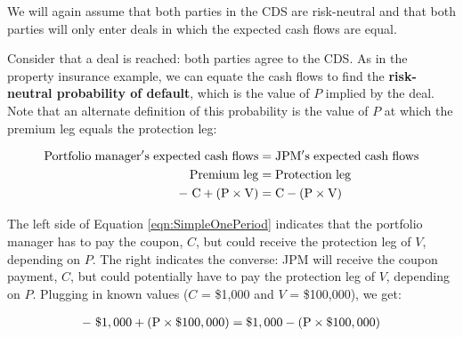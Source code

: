 \documentclass{jss}
\begin{document}
We will again assume that both parties in the CDS are risk-neutral and that both parties will only enter deals in which the expected cash flows are equal.

Consider that a deal is reached: both parties agree to the CDS. As in the property insurance example, we can equate the cash flows to find the \textbf{risk-neutral probability of default}, which is the value of $P$ implied by the deal. Note that an alternate definition of this probability is the value of $P$ at which the premium leg equals the protection leg:

\label{eqn:SimpleOnePeriod}
\begin{align}
   \rm Portfolio\hspace{3pt}manager's\hspace{3pt}expected\hspace{3pt}cash\hspace{3pt}flows &= \rm JPM's\hspace{3  pt}expected\hspace{3pt}cash\hspace{3pt}flows \\
   \rm Premium\hspace{3pt}leg &= \rm Protection\hspace{3pt}leg \\
   \rm -\hspace{3pt}C + (P \times V)  &= \rm C - (P \times V)
\end{align}

The left side of Equation \ref{eqn:SimpleOnePeriod} indicates that the portfolio manager has to pay the coupon, $C$, but could receive the protection leg of $V$, depending on $P$. The right indicates the converse: JPM will receive the coupon payment, $C$, but could potentially have to pay the protection leg of $V$, depending on $P$.
Plugging in known values ($C$ = \$1,000 and $V$ = \$100,000), we get:

\begin{equation}
 \begin{aligned}
   {\rm -\hspace{3pt}\$1,000 + (P \times {\$100,000})  = \$1,000 - (P \times {\$100,000})}
    \end{aligned}
\end{equation}
\end{document}
